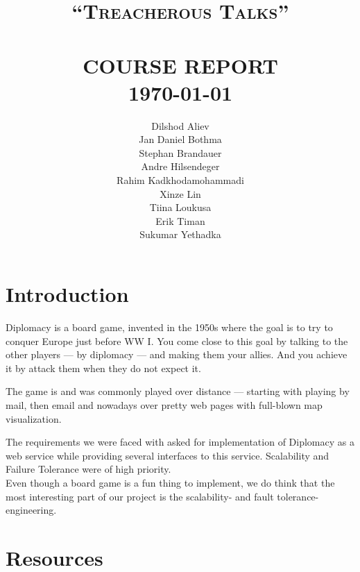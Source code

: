 \documentclass[11pt,a4paper]{report}
\title{    \normalsize \textsc{``Treacherous Talks''} %
             \\[2.0cm]                                %
            \HRule{0.5pt} \\                          %
            \LARGE \textbf{\uppercase{Course Report}} %
            \HRule{2pt} \\ [0.5cm]                    %
            \normalsize \today                        %
        }
\author{Dilshod Aliev\\
        Jan Daniel Bothma\\
        Stephan Brandauer\\
        Andre Hilsendeger\\
        Rahim Kadkhodamohammadi\\
        Xinze Lin\\
        Tiina Loukusa\\
        Erik Timan\\
        Sukumar Yethadka\\
        }
\makeatletter
\def\printtitle{
    {\centering \@title\par}}
\def\printauthor{
    {\centering \large \@author}}
\makeatother
\begin{document}
\thispagestyle{empty}                %

\printtitle
\vfill
\printauthor

\tableofcontents

\chapter{Introduction}
Diplomacy is a board game, invented in the 1950s where the goal is to try to
conquer Europe just before WW I. You come close to this goal by talking to the
other players --- by diplomacy --- and making them your allies. And you achieve
it by attack them when they do not expect it.

The game is and was commonly played over distance --- starting with playing by
mail, then email and nowadays over pretty web pages with full-blown map
visualization.

The requirements we were faced with asked for implementation of Diplomacy as a
web service while providing several interfaces to this service. Scalability and
Failure Tolerance were of high priority. \\
Even though a board game is a fun thing to implement, we do think that the most
interesting part of our project is the scalability- and fault tolerance-
engineering.

\chapter{Resources}
\end{document}
